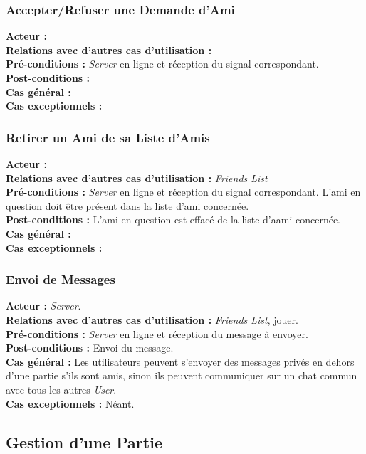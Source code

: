 \documentclass[10pt, a4paper]{article}
\begin{document}
\subsubsection{Accepter/Refuser une Demande d'Ami}
\textbf{Acteur :} \\
\textbf{Relations avec d'autres cas d'utilisation :} \\
\textbf{Pré-conditions :} \textit{Server} en ligne et réception du signal correspondant.\\
\textbf{Post-conditions :} \\
\textbf{Cas général :} \\
\textbf{Cas exceptionnels :} 

\subsubsection{Retirer un Ami de sa Liste d'Amis}
\textbf{Acteur :} \\
\textbf{Relations avec d'autres cas d'utilisation :} \textit{Friends List} \\
\textbf{Pré-conditions :} \textit{Server} en ligne et réception du signal correspondant. L'ami en question doit être présent dans la liste d'ami concernée.\\
\textbf{Post-conditions :} L'ami en question est effacé de la liste d'aami concernée.\\
\textbf{Cas général :} \\
\textbf{Cas exceptionnels :} 

\subsubsection{Envoi de Messages}
\textbf{Acteur :} \textit{Server}. \\
\textbf{Relations avec d'autres cas d'utilisation :} \textit{Friends List}, jouer. \\
\textbf{Pré-conditions :} \textit{Server} en ligne et réception du message à envoyer. \\
\textbf{Post-conditions :} Envoi du message. \\
\textbf{Cas général :} Les utilisateurs peuvent s'envoyer des messages privés en dehors d'une partie s'ils sont amis, sinon ils peuvent communiquer sur un chat commun avec tous les autres \textit{User}. \\
\textbf{Cas exceptionnels :} Néant. \\

\subsection{Gestion d'une Partie}
\end{document}
